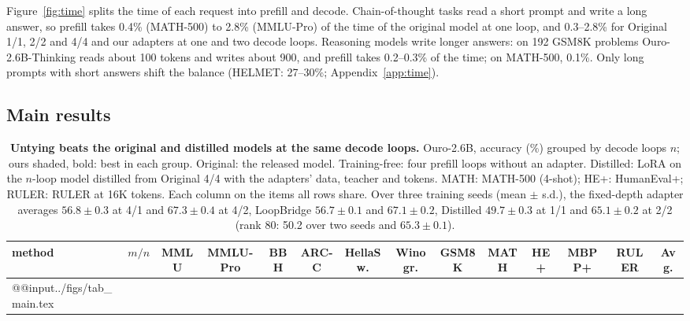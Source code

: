 \documentclass[11pt]{article}
\begin{document}
Figure~\ref{fig:time} splits the time of each request into prefill and decode. Chain-of-thought tasks read a short
prompt and write a long answer, so prefill takes 0.4\% (MATH-500) to 2.8\% (MMLU-Pro) of the time of the original model
at one loop, and 0.3--2.8\% for Original 1/1, 2/2 and 4/4 and our adapters at one and two decode loops. Reasoning
models write longer answers: on 192 GSM8K problems Ouro-2.6B-Thinking reads about 100 tokens and writes about 900, and
prefill takes 0.2--0.3\% of the time; on MATH-500, 0.1\%. Only long prompts with short answers shift the balance
(HELMET: 27--30\%; Appendix~\ref{app:time}).

\subsection{Main results}
\label{sec:main}

\begin{table}[t]
\centering\footnotesize
\setlength\tabcolsep{1.6pt}
\begin{tabular}{@{}lc*{12}{c}@{}}
\toprule
method & $m/n$ & MMLU & MMLU-Pro & BBH & ARC-C & HellaSw. & Winogr. & GSM8K & MATH & HE+ & MBPP+ & RULER & Avg. \\
\midrule
\csname @@input\endcsname ../figs/tab_main.tex
\bottomrule
\end{tabular}
\caption{\textbf{Untying beats the original and distilled models at the same decode loops.} Ouro-2.6B, accuracy (\%)
grouped by decode loops $n$; ours shaded, bold: best in each group. Original: the released model. Training-free: four
prefill loops without an adapter. Distilled: LoRA on the $n$-loop model distilled from Original 4/4 with the adapters'
data, teacher and tokens. MATH: MATH-500 (4-shot); HE+: HumanEval+; RULER: RULER at 16K tokens. Each column on
the items all rows share. Over three training seeds (mean $\pm$ s.d.), the
fixed-depth adapter averages $56.8\pm0.3$ at 4/1 and $67.3\pm0.4$ at 4/2, LoopBridge $56.7\pm0.1$ and $67.1\pm0.2$,
Distilled $49.7\pm0.3$ at 1/1 and $65.1\pm0.2$ at 2/2 (rank 80: 50.2 over two seeds and $65.3\pm0.1$).}
\label{tab:main}
\end{table}
\end{document}
